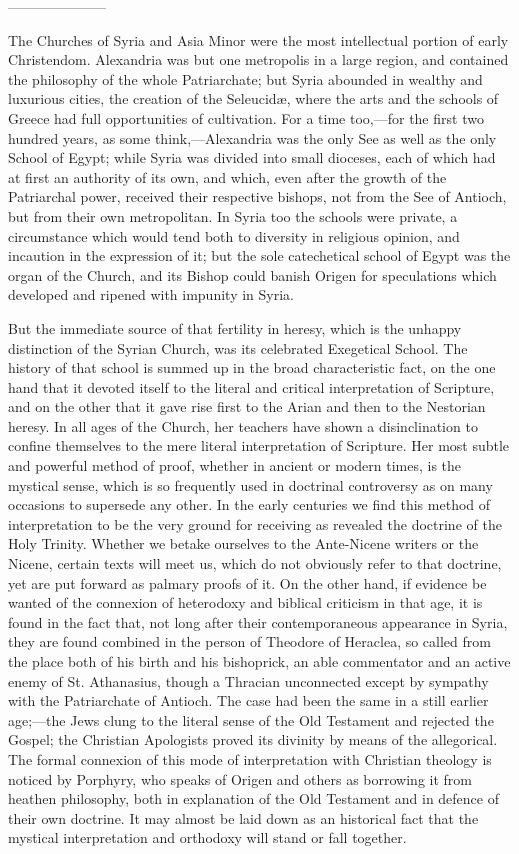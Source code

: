 ———————

The Churches of Syria and Asia Minor were the most intellectual
portion of early Christendom. Alexandria was but one metropolis
in a large region, and contained the philosophy of the whole
Patriarchate; but Syria abounded in wealthy and luxurious cities, the
creation of the Seleucidæ, where the arts and the schools of Greece
had full opportunities of cultivation. For a time too,—for the first
two hundred years, as some think,—Alexandria was the only See as
well as the only School of Egypt; while Syria was divided into small
dioceses, each of which had at first an authority of its own, and
which, even after the growth of the Patriarchal power, received their
respective bishops, not from the See of Antioch, but from their own
metropolitan. In Syria too the schools were private, a circumstance
which would tend both to diversity in religious opinion, and incaution
in the expression of it; but the sole catechetical school of Egypt was
the organ of the Church, and its Bishop could banish Origen for
speculations which developed and ripened with impunity in Syria.

But the immediate source of that fertility in heresy, which is the
unhappy distinction of the Syrian Church, was its celebrated
Exegetical School. The history of that school is summed up in the
broad characteristic fact, on the one hand that it devoted itself to
the literal and critical interpretation of Scripture, and on the other
that it gave rise first to the Arian and then to the Nestorian heresy.
In all ages of the Church, her teachers have shown a disinclination to
confine themselves to the mere literal interpretation of Scripture.
Her most subtle and powerful method of proof, whether in ancient or
modern times, is the mystical sense, which is so frequently used in
doctrinal controversy as on many occasions to supersede any other. In
the early centuries we find this method of interpretation to be the
very ground for receiving as revealed the doctrine of the Holy
Trinity. Whether we betake ourselves to the Ante-Nicene writers or the
Nicene, certain texts will meet us, which do not obviously refer to
that doctrine, yet are put forward as palmary proofs of it. On
the other hand, if evidence be wanted of the connexion of heterodoxy
and biblical criticism in that age, it is found in the fact that, not
long after their contemporaneous appearance in Syria, they are found
combined in the person of Theodore of Heraclea, so called from the
place both of his birth and his bishoprick, an able commentator and an
active enemy of St. Athanasius, though a Thracian unconnected except
by sympathy with the Patriarchate of Antioch. The case had been the
same in a still earlier age;—the Jews clung to the literal sense of
the Old Testament and rejected the Gospel; the Christian Apologists
proved its divinity by means of the allegorical. The formal connexion
of this mode of interpretation with Christian theology is noticed by
Porphyry, who speaks of Origen and others as borrowing it from heathen
philosophy, both in explanation of the Old Testament and in defence of
their own doctrine. It may almost be laid down as an historical fact
that the mystical interpretation and orthodoxy will stand or fall
together.

